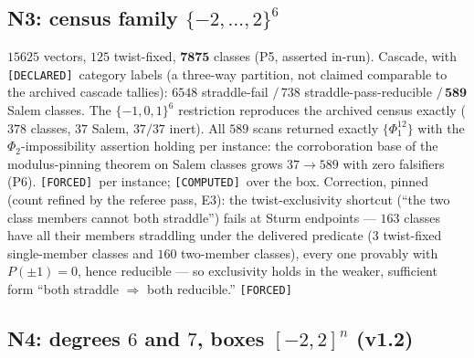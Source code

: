 \documentclass[11pt]{article}
\newcommand{\F}{\textnormal{\texttt{[FORCED]}}}
\newcommand{\C}{\textnormal{\texttt{[COMPUTED]}}}
\newcommand{\Dc}{\textnormal{\texttt{[DECLARED]}}}
\theoremstyle{definition}
\begin{document}
\subsection{N3: census family $\{-2,\dots,2\}^6$}
$15625$ vectors, $125$ twist-fixed, $\mathbf{7875}$ classes (P5, asserted
in-run). Cascade, with \Dc\ category labels (a three-way partition, not
claimed comparable to the archived cascade tallies): $6548$ straddle-fail
$/\,738$ straddle-pass-reducible $/\,\mathbf{589}$ Salem classes. The
$\{-1,0,1\}^6$ restriction reproduces the archived census exactly ($378$
classes, $37$ Salem, $37/37$ inert). All $589$ scans returned exactly
$\{\Phi_1^{12}\}$ with the $\Phi_2$-impossibility assertion holding per
instance: the corroboration base of the modulus-pinning theorem on Salem
classes grows $37\to589$ with zero falsifiers (P6). \F\ per instance; \C\
over the box. Correction, pinned (count refined by the referee pass, E3):
the twist-exclusivity shortcut (``the two class members cannot both
straddle'') fails at Sturm endpoints --- $163$ classes have all their
members straddling under the delivered predicate ($3$ twist-fixed
single-member classes and $160$ two-member classes), every one provably
with $P(\pm1)=0$, hence reducible --- so exclusivity holds in the weaker,
sufficient form ``both straddle $\Rightarrow$ both reducible.'' \F

\subsection{N4: degrees $6$ and $7$, boxes $[-2,2]^n$ (v1.2)}
\label{sec:n4}
\end{document}
